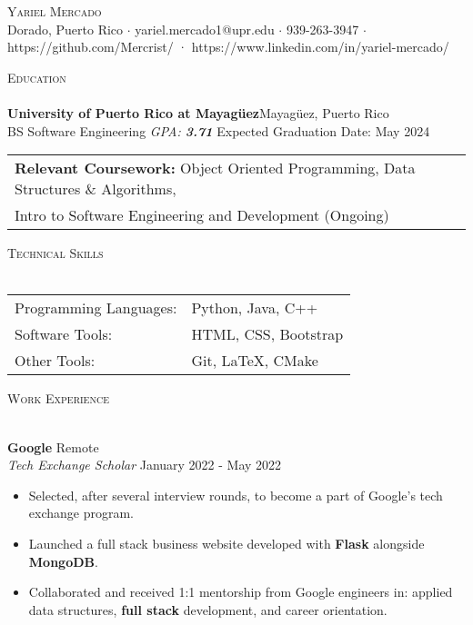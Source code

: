 \documentclass[a4paper]{article}
\newcommand{\lineunder} {
    \vspace*{-8pt} \\
    \hspace*{-18pt} \hrulefill \\
}
\newcommand{\header} [1] {
    {\hspace*{-18pt}\vspace*{6pt} \textsc{#1}}
    \vspace*{-6pt} \lineunder
}
\begin{document}
\vspace*{-40pt}

    

\vspace*{-10pt}
\begin{center}
	{\Huge \scshape {Yariel Mercado}}\\
	Dorado, Puerto Rico $\cdot$ yariel.mercado1@upr.edu $\cdot$ 939-263-3947 $\cdot$ https://github.com/Mercrist/ · https://www.linkedin.com/in/yariel-mercado/\\
\end{center}

\header{Education}
\textbf{University of Puerto Rico at Mayagüez}\hfill Mayagüez, Puerto Rico\\
BS Software Engineering \textit{GPA: \bf{3.71}} \hfill Expected Graduation Date: May 2024\\	

\vspace{2mm}
\begin{tabular}{ l l }
	\textbf{Relevant Coursework:} Object Oriented 	                    				Programming, Data Structures \& Algorithms, \\ Intro to Software Engineering and Development (Ongoing) 
\vspace{2mm}
\end{tabular}

\header{Technical Skills}
\begin{tabular}{ l l }
	Programming Languages:       & Python, Java, C++                \\
	Software Tools: & HTML, CSS, Bootstrap \\
	Other Tools:   & Git, \LaTeX{}, CMake  \\
	
\end{tabular}
\vspace{2mm}

\header{Work Experience}
\vspace{-1mm}

\textbf{Google} \hfill Remote\\
\textit{Tech Exchange Scholar} \hfill January 2022 - May 2022\\
\vspace{-2mm}
\begin{itemize} \itemsep -1pt
	\item Selected, after several interview rounds, to become a part of Google's tech exchange program. 
	\item Launched a full stack business website developed with \textbf{Flask} alongside \textbf{MongoDB}.
	\item Collaborated and received 1:1 mentorship from Google engineers in: applied data structures, \textbf{full stack} development, and career orientation.
\end{itemize}
\end{document}
